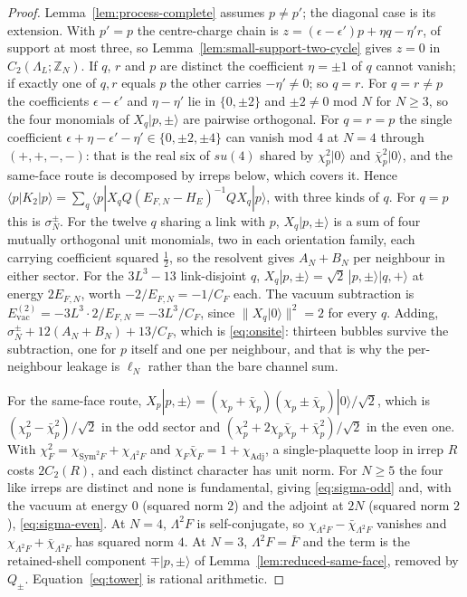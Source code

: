 \documentclass[11pt]{article}
\theoremstyle{plain}
\theoremstyle{definition}
\theoremstyle{remark}
\newcommand{\chk}[1]{}
\newcommand{\CF}{C_F}
\begin{document}
\begin{proof}
Lemma~\ref{lem:process-complete} assumes $p\ne p'$; the diagonal case is its
extension. With $p'=p$ the centre-charge chain is
$z=(\epsilon-\epsilon')p+\eta q-\eta'r$, of support at most three, so
Lemma~\ref{lem:small-support-two-cycle} gives $z=0$ in
$C_2(\Lambda_L;\mathbb Z_N)$. If $q$, $r$ and $p$ are distinct the coefficient
$\eta=\pm1$ of $q$ cannot vanish; if exactly one of $q,r$ equals $p$ the other
carries $-\eta'\ne0$; so $q=r$. For $q=r\ne p$ the coefficients
$\epsilon-\epsilon'$ and $\eta-\eta'$ lie in $\{0,\pm2\}$ and $\pm2\ne0$ mod
$N$ for $N\ge3$, so the four monomials of $X_q|p,\pm\rangle$ are pairwise
orthogonal. For $q=r=p$ the single coefficient
$\epsilon+\eta-\epsilon'-\eta'\in\{0,\pm2,\pm4\}$ can vanish mod $4$ at $N=4$
through $(+,+,-,-)$: that is the real six of $su(4)$ shared by
$\chi_p^2|0\rangle$ and $\bar\chi_p^2|0\rangle$, and the same-face route is
decomposed by irreps below, which covers it. Hence
$\langle p|K_2|p\rangle=\sum_q\langle p|X_qQ(E_{F,N}-H_E)^{-1}QX_q|p\rangle$,
with three kinds of $q$. For $q=p$ this is $\sigma^\pm_N$. For the twelve $q$
sharing a link with $p$, $X_q|p,\pm\rangle$ is a sum of four mutually
orthogonal unit monomials, two in each orientation family, each carrying
coefficient squared $\tfrac12$, so the resolvent gives $A_N+B_N$ per
neighbour in either sector. For the $3L^3-13$ link-disjoint $q$,
$X_q|p,\pm\rangle=\sqrt2\,|p,\pm\rangle|q,+\rangle$ at energy $2E_{F,N}$, worth
$-2/E_{F,N}=-1/\CF$ each. The vacuum subtraction is
$E^{(2)}_{\mathrm{vac}}=-3L^3\cdot2/E_{F,N}=-3L^3/\CF$, since
$\|X_q|0\rangle\|^2=2$ for every $q$. Adding,
$\sigma^\pm_N+12(A_N+B_N)+13/\CF$, which is \eqref{eq:onsite}: thirteen
bubbles survive the subtraction, one for $p$ itself and one per neighbour,
and that is why the per-neighbour leakage is $\ell_N$ rather than the bare
channel sum.

For the same-face route,
$X_p|p,\pm\rangle=(\chi_p+\bar\chi_p)(\chi_p\pm\bar\chi_p)|0\rangle/\sqrt2$,
which is $(\chi_p^2-\bar\chi_p^2)/\sqrt2$ in the odd sector and
$(\chi_p^2+2\chi_p\bar\chi_p+\bar\chi_p^2)/\sqrt2$ in the even one. With
$\chi_F^2=\chi_{\mathrm{Sym}^2F}+\chi_{\Lambda^2F}$ and
$\chi_F\bar\chi_F=1+\chi_{\mathrm{Adj}}$, a single-plaquette loop in irrep $R$
costs $2C_2(R)$, and each distinct character has unit norm. For $N\ge5$ the
four like irreps are distinct and none is fundamental, giving
\eqref{eq:sigma-odd} and, with the vacuum at energy $0$ (squared norm $2$)
and the adjoint at $2N$ (squared norm $2$), \eqref{eq:sigma-even}. At $N=4$,
$\Lambda^2F$ is self-conjugate, so $\chi_{\Lambda^2F}-\bar\chi_{\Lambda^2F}$
vanishes and $\chi_{\Lambda^2F}+\bar\chi_{\Lambda^2F}$ has squared norm $4$.
At $N=3$, $\Lambda^2F=\bar F$ and the term is the retained-shell component
$\mp|p,\pm\rangle$ of Lemma~\ref{lem:reduced-same-face}, removed by $Q_\pm$.
Equation~\eqref{eq:tower} is rational arithmetic.
\end{proof}
\chk{the second-order on-site scalar is closed form at every rank: same-face route + 1/C\_F + 12 ell\_N, and L cancels}
\chk{the same-face route is exceptional at N = 3 and N = 4: Lambda\^{}2 F is the conjugate fundamental, then self-conjugate}
\end{document}
